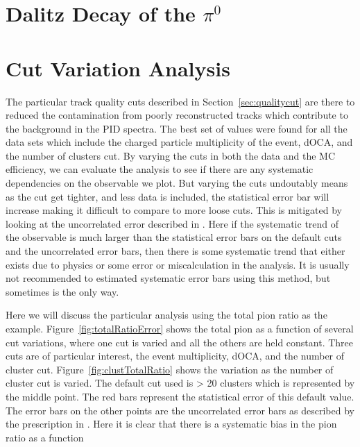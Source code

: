 \clearpage

\section{Dalitz Decay of the $\pi^0$}
\label{appen:dalitz}


\section{Cut Variation Analysis}
\label{sec:cutvar}
The particular track quality cuts described in Section~\ref{sec:qualitycut} are there to reduced the contamination from poorly reconstructed tracks which contribute to the background in the PID spectra. The best set of values were found for all the data sets which include the charged particle multiplicity of the event, dOCA, and the number of clusters cut. By varying the cuts in both the data and the MC efficiency, we can evaluate the analysis to see if there are any systematic dependencies on the observable we plot. But varying the cuts undoutably means as the cut get tighter, and less data is included, the statistical error bar will increase making it difficult to compare to more loose cuts. This is mitigated by looking at the uncorrelated error described in \cite{dataAnalysis}. Here if the systematic trend of the observable is much larger than the statistical error bars on the default cuts and the uncorrelated error bars, then there is some systematic trend that either exists due to physics or some error or miscalculation in the analysis. It is usually not recommended to estimated systematic error bars using this method, but sometimes is the only way. 

Here we will discuss the particular analysis using the total pion ratio as the example. Figure~\ref{fig:totalRatioError} shows the total pion as a function of several cut variations, where one cut is varied and all the others are held constant. Three cuts are of particular interest, the event multiplicity, dOCA, and the number of cluster cut. Figure~\ref{fig:clustTotalRatio} shows the variation as the number of cluster cut is varied. The default cut used is > 20 clusters which is represented by the middle point. The red bars represent the statistical error of this default value. The error bars on the other points are the uncorrelated error bars as described by the prescription in \cite{dataAnalysis}. Here it is clear that there is a systematic bias in the pion ratio as a function 



